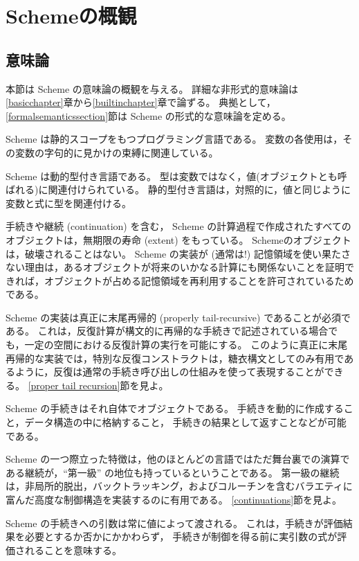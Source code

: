 
\chapter{Schemeの概観}

\section{意味論}
\label{semanticsection}

本節は Scheme の意味論の概観を与える。
詳細な非形式的意味論は\ref{basicchapter}章から\ref{builtinchapter}章で論ずる。
典拠として，\ref{formalsemanticssection}節は Scheme の形式的な意味論を定める。

\vest Scheme は静的スコープをもつプログラミング言語である。
変数の各使用は，その変数の字句的に見かけの束縛に関連している。

\vest Scheme は動的型付き言語である。
型は変数ではなく，値(オブジェクトとも呼ばれる)に関連付けられている。
静的型付き言語は，対照的に，値と同じように変数と式に型を関連付ける。

\vest 手続きや継続 (continuation) を含む， Scheme の計算過程で作成されたすべてのオブジェクトは，無期限の寿命 (extent) をもっている。
Schemeのオブジェクトは，破壊されることはない。
Scheme の実装が (通常は!) 記憶領域を使い果たさない理由は，あるオブジェクトが将来のいかなる計算にも関係ないことを証明できれば，オブジェクトが占める記憶領域を再利用することを許可されているためである。

\vest Scheme の実装は真正に末尾再帰的 (properly tail-recursive) であることが必須である。
これは，反復計算が構文的に再帰的な手続きで記述されている場合でも，一定の空間における反復計算の実行を可能にする。
このように真正に末尾再帰的な実装では，特別な反復コンストラクトは，糖衣構文としてのみ有用であるように，反復は通常の手続き呼び出しの仕組みを使って表現することができる。
\ref{proper tail recursion}節を見よ。

\vest Scheme の手続きはそれ自体でオブジェクトである。
手続きを動的に作成すること，データ構造の中に格納すること，
手続きの結果として返すことなどが可能である。

\vest Scheme の一つ際立った特徴は，他のほとんどの言語ではただ舞台裏での演算である継続が，``第一級'' の地位も持っているということである。
第一級の継続は，非局所的脱出，バックトラッキング，およびコルーチンを含むバラエティに富んだ高度な制御構造を実装するのに有用である。
\ref{continuations}節を見よ。

\vest Scheme の手続きへの引数は常に値によって渡される。
これは，手続きが評価結果を必要とするか否かにかかわらず，
手続きが制御を得る前に実引数の式が評価されることを意味する。


